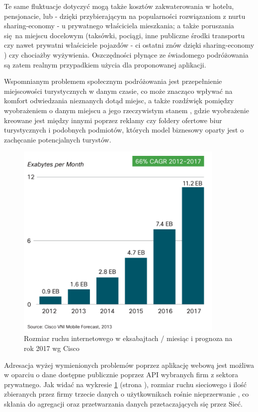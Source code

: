 \documentclass[oneside]{mgr}
\begin{document}
Te same fluktuacje dotyczyć mogą także kosztów zakwaterowania w hotelu, pensjonacie, lub - dzięki przybierającym na popularności rozwiązaniom z nurtu sharing-economy \cite{sharingEconomyWhyParticipate} - u prywatnego właściciela mieszkania; a także poruszania się na miejscu docelowym (taksówki, pociągi, inne publiczne środki transportu czy nawet prywatni właściciele pojazdów - ci ostatni znów dzięki sharing-economy \cite{sharingEconomyWhyParticipate}) czy chociażby wyżywienia. Oszczędności płynące ze świadomego podróżowania są zatem realnym przypadkiem użycia dla proponowanej aplikacji.

Wspomnianym problemem społecznym podróżowania jest przepełnienie miejscowości turystycznych w danym czasie, co może znacząco wpływać na komfort odwiedzania nieznanych dotąd miejsc, a także rozdźwięk pomiędzy wyobrażeniem o danym miejscu a jego rzeczywistym stanem \cite{dailyMailTourismExpectationVsReality}, gdzie wyobrażenie kreowane jest między innymi poprzez reklamy czy foldery ofertowe biur turystycznych i podobnych podmiotów, których model biznesowy oparty jest o zachęcanie potencjalnych turystów.

\begin{figure}
	\centering
	\includegraphics[width=10cm]{2017-03-2018:48:10}
	\caption{Rozmiar ruchu internetowego w eksabajtach / miesiąc i prognoza na rok 2017 wg Cisco \cite{ciscoInternetTrafficSize}}
	\label{fig:rozmiarRuchuWInternecie}
\end{figure}

Adresacja wyżej wymienionych problemów poprzez aplikację webową jest możliwa w oparciu o dane dostępne publicznie poprzez API wybranych firm z sektora prywatnego. Jak widać na wykresie \ref{fig:rozmiarRuchuWInternecie} (strona \pageref{fig:rozmiarRuchuWInternecie}), rozmiar ruchu sieciowego i ilość zbieranych przez firmy trzecie danych o użytkownikach rośnie nieprzerwanie \cite{ciscoInternetTrafficSize}, co skłania do agregacji oraz przetwarzania danych przetaczających się przez Sieć.
\end{document}
